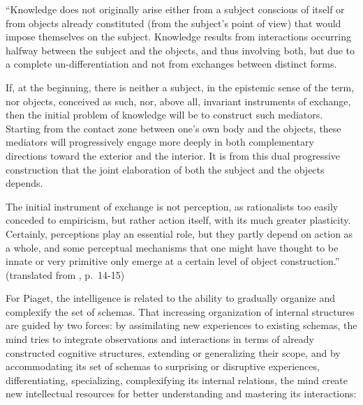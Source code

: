\documentclass[runningheads]{llncs}
\begin{document}
\begin{adjustwidth}{1cm}{1cm}
``Knowledge does not originally arise either from a subject conscious of itself or from objects already constituted (from the subject's point of view) that would impose themselves on the subject. 
Knowledge results from interactions occurring halfway between the subject and the objects, and thus involving both, but due to a complete un-differentiation and not from exchanges between distinct forms.

If, at the beginning, there is neither a subject, in the epistemic sense of the term, nor objects, conceived as such, nor, above all, invariant instruments of exchange, then the initial problem of knowledge will be to construct such mediators. 
Starting from the contact zone between one's own body and the objects, these mediators will progressively engage more deeply in both complementary directions toward the exterior and the interior. 
It is from this dual progressive construction that the joint elaboration of both the subject and the objects depends.

The initial instrument of exchange is not perception, as rationalists too easily conceded to empiricism, but rather action itself, with its much greater plasticity. 
Certainly, perceptions play an essential role, but they partly depend on action as a whole, and some perceptual mechanisms that one might have thought to be innate or very primitive only emerge at a certain level of object construction.'' (translated from \cite{piaget_lepistemologie_2011}, p.~14-15)
\\

\end{adjustwidth}

For Piaget, the intelligence is related to the ability to gradually organize and complexify the set of schemas. 
That increasing organization of internal structures are guided by two forces: 
by assimilating new experiences to existing schemas, the mind tries to integrate observations and interactions in terms of already constructed cognitive structures, extending or generalizing their scope, and
by accommodating its set of schemas to surprising or disruptive experiences, differentiating, specializing, complexifying its internal relations, the mind create new intellectual resources for better understanding and mastering its interactions: 
\\
\end{document}
